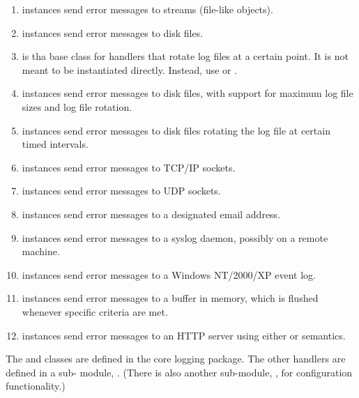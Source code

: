 \begin{enumerate}

\item {} instances send error messages to
streams (file-like objects).

\item {} instances send error messages to disk
files.

\item {} is tha base class for handlers that
rotate log files at a certain point. It is not meant to be  instantiated
directly. Instead, use  or
.

\item {} instances send error messages to disk
files, with support for maximum log file sizes and log file rotation.

\item {} instances send error messages to
disk files rotating the log file at certain timed intervals.

\item {} instances send error messages to
TCP/IP sockets.

\item {} instances send error messages to UDP
sockets.

\item {} instances send error messages to a
designated email address.

\item {} instances send error messages to a
\UNIX{} syslog daemon, possibly on a remote machine.

\item {} instances send error messages to a
Windows NT/2000/XP event log.

\item {} instances send error messages to a
buffer in memory, which is flushed whenever specific criteria are
met.

\item {} instances send error messages to an
HTTP server using either  or  semantics.

\end{enumerate}

The  and  classes are defined
in the core logging package. The other handlers are defined in a sub-
module, . (There is also another sub-module,
, for configuration functionality.)

